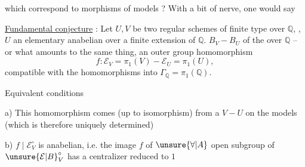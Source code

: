 which correspond to morphisms of models ? With a bit of nerve, one would say

\uline{Fundamental conjecture} : Let $U,V$ be two regular schemes of finite type over $\mathbb{Q}$, , $U$ an elementary anabelian   over a finite extension of $\mathbb{Q}$.     $B_V-B_U$ of the   over $\mathbb{Q}$ -- or what amounts to the same thing, an outer group homomorphism
\[
f:\mathcal E_V=\pi_1(V)-\mathcal E_U=\pi_1(U),
\]
compatible with the homomorphisms into $\Gamma_{\mathbb{Q}}=\pi_1(\mathbb{Q})$.

Equivalent conditions

 a) This homomorphism comes (up to isomorphism) from a  $V-U$ on the models (which is therefore uniquely determined)

 b) $f\mid\mathcal E_V^\circ$ is anabelian, i.e. the image  $f$ of $\unsure{\forall|A}$ open subgroup of $\unsure{\mathcal E|B}_V^\circ$ has a centralizer reduced to $1$
